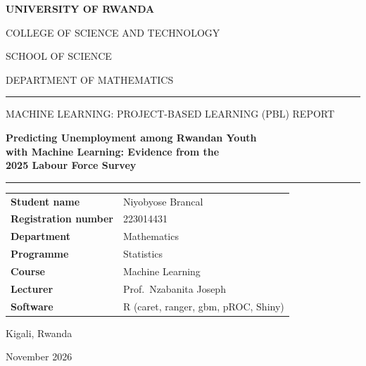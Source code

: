 \documentclass[11pt,a4paper]{article}
\begin{document}
\begin{titlepage}
\centering
\vspace*{1.5cm}
{\Large\bfseries UNIVERSITY OF RWANDA\par}
\vspace{0.3cm}
{\large COLLEGE OF SCIENCE AND TECHNOLOGY\par}
{SCHOOL OF SCIENCE\par}
{DEPARTMENT OF MATHEMATICS\par}
\vspace{2cm}
\rule{0.85\textwidth}{1pt}\par\vspace{0.3cm}
{MACHINE LEARNING: PROJECT-BASED LEARNING (PBL) REPORT\par}
\vspace{0.6cm}
{\LARGE\bfseries Predicting Unemployment among Rwandan Youth\\[4pt]
with Machine Learning: Evidence from the\\[4pt] 2025 Labour Force Survey\par}
\vspace{0.4cm}
\rule{0.85\textwidth}{1pt}\par
\vspace{2cm}
\begin{tabular}{@{}p{5cm}p{7cm}@{}}
\textbf{Student name}        & Niyobyose Brancal \\
\textbf{Registration number} & 223014431 \\
\textbf{Department}          & Mathematics \\
\textbf{Programme}           & Statistics \\
\textbf{Course}              & Machine Learning \\
\textbf{Lecturer}            & Prof.\ Nzabanita Joseph \\
\textbf{Software}            & R (caret, ranger, gbm, pROC, Shiny)
\end{tabular}
\vfill
{Kigali, Rwanda\par}
{November 2026\par}
\end{titlepage}
\setcounter{page}{2}

\end{document}
